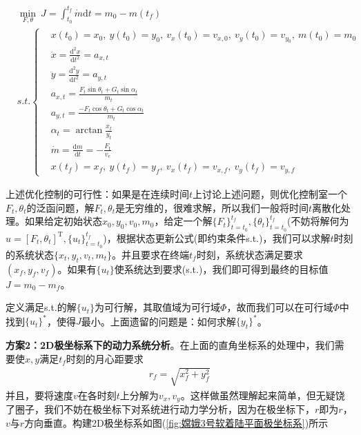             \begin{align*}
            & \min _{F,\theta} \ J = \int_{t_0}^{t_f}\dot{m}\mathrm{d}t = m_0 - m(t_f)\\
            & s.t.\left\{
            \begin{aligned}
            &x(t_0) = x_0,\ y(t_0) = y_0, \ v_x(t_0) = v_{x,0},\ v_y(t_0) = v_{y_0}, \ m(t_0) = m_0\\
            &\ddot{x} = \frac{\mathrm{d}^2x}{\mathrm{d}t^2} = a_{x,t}\\
            &\ddot{y} = \frac{\mathrm{d}^2y}{\mathrm{d}t^2} = a_{y,t}\\
            & a_{x,t} = \frac{F_t\sin \theta_t+G_t\sin \alpha_t}{m_t}\\
            & a_{y,t} = \frac{-F_t\cos \theta_t+G_t\cos \alpha_t}{m_t}\\
            &\alpha_t = \arctan\frac{x_t}{y_t}\\
            & \dot{m} = \frac{\mathrm{d}m}{\mathrm{d}t} = -\frac{F_t}{v_e}\\
            & x(t_f) = x_f,\ y(t_f) = y_f,\ v_x(t_f) = v_{x,f},\ v_y(t_f) = v_{y,f}
            \end{aligned}
            \right.
            \end{align*}
            \par
            上述优化控制的可行性：如果是在连续时间$t$上讨论上述问题，则优化控制室一个$F_t,\theta_t$的泛函问题，解$F_t,\theta_t$是无穷维的，很难求解，所以我们一般将时间$t$离散化处理。如果给定初始状态$x_0,y_0,v_0,m_0$，给定一个解$\{F_t\}_{t=t_0}^{t_f},\{\theta_t\}_{t=t_0}^{t_f}$(不妨将解何为$u = [F_t,\theta_t]^\mathrm{T},\{u_t\}_{t=t_0}^{t_f}$)，根据状态更新公式(即约束条件s.t.)，我们可以求解$t$时刻的系统状态$\{x_t,y_t,v_t,m_t\}$。并且要求在终端$t_f$时刻，系统状态满足要求$(x_f,y_f,v_f)$。如果有$\{u_t\}$使系统达到要求(s.t.)，我们即可得到最终的目标值$J = m_0-m_f$。
            \par
            定义满足s.t.的解$\{u_t\}$为可行解，其取值域为可行域$\Phi$，故而我们可以在可行域$\Phi$中找到$\{u_t\}^*$，使得$J$最小。上面遗留的问题是：如何求解$\{y_t\}^*$。
            \par
            \textbf{方案2：2D极坐标系下的动力系统分析}。在上面的直角坐标系的处理中，我们需要使$x,y$满足$t_f$时刻的月心距要求
            \begin{align*}
            r_f= \sqrt{x_f^2+y_f^2}
            \end{align*}
            并且，要将速度$v$在各时刻$t$上分解为$v_x,v_y$。这样做虽然理解起来简单，但无疑饶了圈子，我们不妨在极坐标下对系统进行动力学分析，因为在极坐标下，$r$即为$r$，$v$与$r$方向垂直。构建2D极坐标系如图(\ref{fig:嫦娥3号软着陆平面极坐标系})所示
